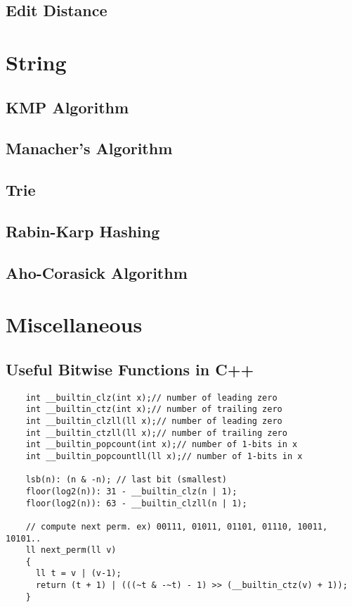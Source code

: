 \documentclass[landscape,8pt]{article}
\begin{document}
\begin{multicols}{2}
  \subsection{Edit Distance}

\section{String}
  \subsection{KMP Algorithm}

  \subsection{Manacher's Algorithm}

  \subsection{Trie}

  \subsection{Rabin-Karp Hashing}

  \subsection{Aho-Corasick Algorithm}
\columnbreak

\section{Miscellaneous}
  \subsection{Useful Bitwise Functions in C++}
  \begin{verbatim}
    int __builtin_clz(int x);// number of leading zero
    int __builtin_ctz(int x);// number of trailing zero
    int __builtin_clzll(ll x);// number of leading zero
    int __builtin_ctzll(ll x);// number of trailing zero
    int __builtin_popcount(int x);// number of 1-bits in x
    int __builtin_popcountll(ll x);// number of 1-bits in x

    lsb(n): (n & -n); // last bit (smallest)
    floor(log2(n)): 31 - __builtin_clz(n | 1);
    floor(log2(n)): 63 - __builtin_clzll(n | 1);

    // compute next perm. ex) 00111, 01011, 01101, 01110, 10011, 10101..
    ll next_perm(ll v)
    {
      ll t = v | (v-1);
      return (t + 1) | (((~t & -~t) - 1) >> (__builtin_ctz(v) + 1));
    }
  \end{verbatim}
  \columnbreak

\end{multicols}
\end{document}
